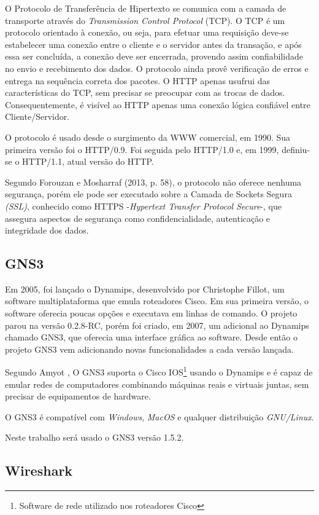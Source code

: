O Protocolo de Transferência de Hipertexto se comunica com a camada de transporte através do \textit{Transmission Control Protocol} (TCP). O TCP é um protocolo orientado à conexão, ou seja, para efetuar uma requisição deve-se estabelecer uma conexão entre o cliente e o servidor antes da transação, e após essa ser concluída, a conexão deve ser encerrada, provendo assim confiabilidade no envio e recebimento dos dados. O protocolo ainda provê verificação de erros e entrega na sequência correta dos pacotes. O HTTP apenas usufrui das características do TCP, sem precisar se preocupar com as trocas de dados. Consequentemente, é visível ao HTTP apenas uma conexão lógica confiável entre Cliente/Servidor.

O protocolo é usado desde o surgimento da WWW comercial, em 1990. Sua primeira versão foi o HTTP/0.9. Foi seguida pelo HTTP/1.0 e, em 1999, definiu-se o HTTP/1.1, atual versão do HTTP.

Segundo Forouzan e Mosharraf (2013, p. 58), o protocolo não oferece nenhuma segurança, porém ele pode ser executado sobre a Camada de Sockets Segura \textit{(SSL)}, conhecido como HTTPS -\textit{Hypertext Transfer Protocol Secure}-, que assegura aspectos de segurança como confidencialidade, autenticação e integridade dos dados.

\subsection{GNS3}

Em 2005, foi lançado o Dynamips, desenvolvido por Christophe Fillot, um software multiplataforma que emula roteadores Cisco. Em sua primeira versão, o software oferecia poucas opções e executava em linhas de comando. O projeto parou na versão 0.2.8-RC, porém foi criado, em 2007, um adicional ao Dynamips chamado GNS3, que oferecia uma interface gráfica ao software.  Desde então o projeto GNS3 vem adicionando novas funcionalidades a cada versão lançada.

Segundo Amyot \cite{amyot}, O GNS3 suporta o Cisco IOS\footnote{Software de rede utilizado nos roteadores Cisco} usando o Dynamips e é capaz de emular redes de computadores combinando máquinas reais e virtuais juntas, sem precisar de equipamentos de hardware.

O GNS3 é compatível com \textit{Windows}, \textit{MacOS} e qualquer distribuição \textit{GNU/Linux}.

Neste trabalho será usado o GNS3 versão 1.5.2.

\subsection{Wireshark}

